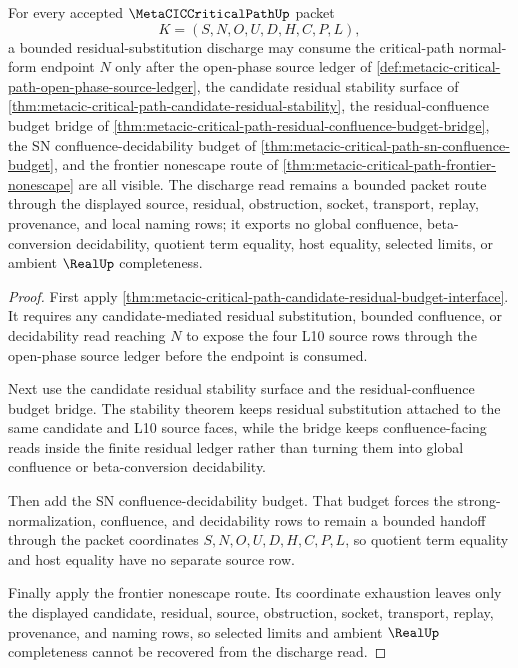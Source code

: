 \begin{theorem}
\label{thm:metacic-critical-path-candidate-residual-discharge-budget}
For every accepted $\MetaCICCriticalPathUp$ packet
$$
K=(S,N,O,U,D,H,C,P,L),
$$
a bounded residual-substitution discharge may consume the critical-path normal-form endpoint $N$ only after the open-phase source ledger of \autoref{def:metacic-critical-path-open-phase-source-ledger}, the candidate residual stability surface of \autoref{thm:metacic-critical-path-candidate-residual-stability}, the residual-confluence budget bridge of \autoref{thm:metacic-critical-path-residual-confluence-budget-bridge}, the SN confluence-decidability budget of \autoref{thm:metacic-critical-path-sn-confluence-budget}, and the frontier nonescape route of \autoref{thm:metacic-critical-path-frontier-nonescape} are all visible. The discharge read remains a bounded packet route through the displayed source, residual, obstruction, socket, transport, replay, provenance, and local naming rows; it exports no global confluence, beta-conversion decidability, quotient term equality, host equality, selected limits, or ambient $\RealUp$ completeness.
\end{theorem}
\begin{proof}
First apply \autoref{thm:metacic-critical-path-candidate-residual-budget-interface}. It requires any candidate-mediated residual substitution, bounded confluence, or decidability read reaching $N$ to expose the four L10 source rows through the open-phase source ledger before the endpoint is consumed.

Next use the candidate residual stability surface and the residual-confluence budget bridge. The stability theorem keeps residual substitution attached to the same candidate and L10 source faces, while the bridge keeps confluence-facing reads inside the finite residual ledger rather than turning them into global confluence or beta-conversion decidability.

Then add the SN confluence-decidability budget. That budget forces the strong-normalization, confluence, and decidability rows to remain a bounded handoff through the packet coordinates $S,N,O,U,D,H,C,P,L$, so quotient term equality and host equality have no separate source row.

Finally apply the frontier nonescape route. Its coordinate exhaustion leaves only the displayed candidate, residual, source, obstruction, socket, transport, replay, provenance, and naming rows, so selected limits and ambient $\RealUp$ completeness cannot be recovered from the discharge read.
\end{proof}
